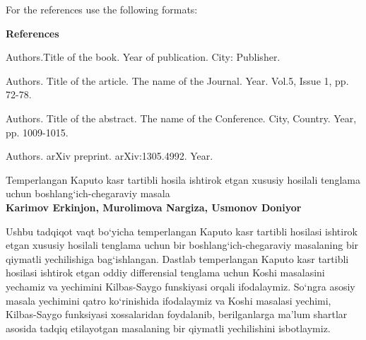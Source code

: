 \documentclass{article}
\begin{document}
For the references use the following formats: 

\bigskip

\textbf{\Large References}

\begin{enumerate}

 Authors.Title of the book. Year of publication. City: Publisher.


 Authors. Title of the article. The name of the Journal. Year. Vol.5, Issue 1,
pp. 72-78.

 Authors. Title of the abstract. The name of the Conference. City, Country. Year, pp. 1009-1015.


 Authors. arXiv preprint. arXiv:1305.4992. Year. 

\end{enumerate}


\newpage

\begin{center}
	{\sc Temperlangan Kaputo kasr tartibli hosila ishtirok etgan xususiy hosilali tenglama uchun boshlang`ich-chegaraviy masala }\\
	{\bf Karimov Erkinjon, Murolimova Nargiza, Usmonov Doniyor}\\
\end{center}
\medskip

{Ushbu tadqiqot vaqt bo`yicha temperlangan Kaputo kasr tartibli hosilasi ishtirok etgan xususiy hosilali tenglama uchun bir boshlang`ich-chegaraviy masalaning bir qiymatli yechilishiga bag`ishlangan. Dastlab temperlangan Kaputo kasr tartibli hosilasi ishtirok etgan oddiy differensial tenglama uchun Koshi masalasini yechamiz va yechimini Kilbas-Saygo funskiyasi orqali ifodalaymiz. So`ngra asosiy masala yechimini qatro ko`rinishida ifodalaymiz va Koshi masalasi yechimi, Kilbas-Saygo funksiyasi xossalaridan foydalanib, berilganlarga ma'lum shartlar asosida tadqiq etilayotgan masalaning bir qiymatli yechilishini isbotlaymiz.}\\
\end{document}
